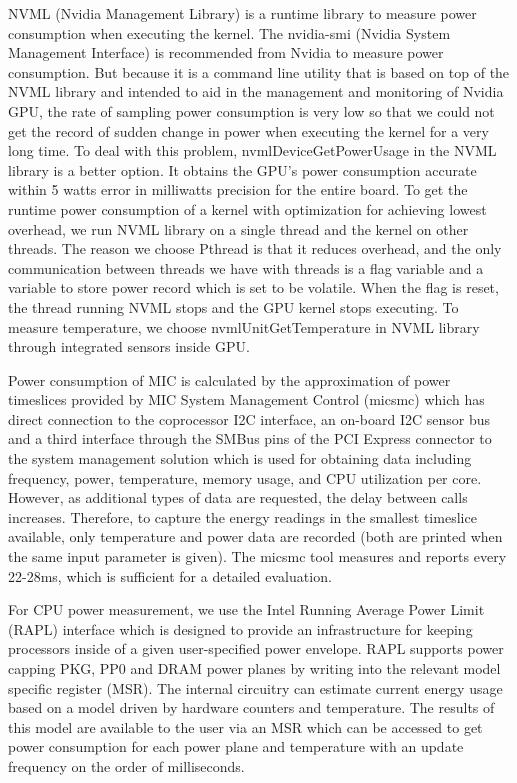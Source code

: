 NVML (Nvidia Management Library) \cite{R:16} is a runtime library to measure power consumption when executing the kernel. The nvidia-smi (Nvidia System Management Interface) is recommended from Nvidia to measure power consumption. But because it is a command line utility that is based on top of the NVML library and intended to aid in the management and monitoring of Nvidia GPU, the rate of sampling power consumption is very low so that we could not get the record of sudden change in power when executing the kernel for a very long time. To deal with this problem, nvmlDeviceGetPowerUsage in the NVML library is a better option. It obtains the GPU's power consumption accurate within 5 watts error in milliwatts precision for the entire board. 
To get the runtime power consumption of a kernel with optimization for achieving lowest overhead, we run NVML library on a single thread and the kernel on other threads. The reason we choose Pthread is that it reduces overhead, and the only communication between threads we have with threads is a flag variable and a variable to store power record which is set to be volatile. When the flag is reset, the thread running NVML stops and the GPU kernel stops executing. To measure temperature, we choose nvmlUnitGetTemperature in NVML library through integrated sensors inside GPU.

 Power consumption of MIC is calculated by the approximation of power timeslices provided by MIC System Management Control (micsmc) \cite{R:17} which has direct connection to the coprocessor I2C interface, an on-board I2C sensor bus and a third interface through the SMBus pins of the PCI Express connector to the system management solution which is used for obtaining data including frequency, power, temperature, memory usage, and CPU utilization per core. However, as additional types of data are requested, the delay between calls increases. Therefore, to capture the energy readings in the smallest timeslice available, only temperature and power data are recorded (both are printed when the same input parameter is given). The micsmc tool measures and reports every 22-28ms, which is sufficient for a detailed evaluation. 


 For CPU power measurement, we use the Intel Running Average Power Limit (RAPL) interface \cite{R:15} which is designed to provide an infrastructure for keeping processors inside of a given user-specified power envelope. RAPL supports power capping PKG, PP0 and DRAM power planes by writing into the relevant model specific register (MSR). The internal circuitry can estimate current energy usage based on a model driven by hardware counters and temperature. The results of this model are available to the user via an MSR which can be accessed to get power consumption for each power plane and temperature with an update frequency on the order of milliseconds. 




